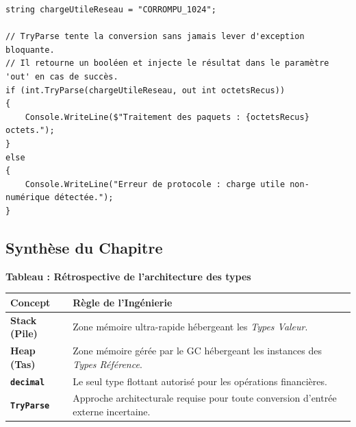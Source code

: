\begin{lstlisting}[caption={Conversion sécurisée via TryParse}]
string chargeUtileReseau = "CORROMPU_1024";

// TryParse tente la conversion sans jamais lever d'exception bloquante.
// Il retourne un booléen et injecte le résultat dans le paramètre 'out' en cas de succès.
if (int.TryParse(chargeUtileReseau, out int octetsRecus))
{
    Console.WriteLine($"Traitement des paquets : {octetsRecus} octets.");
}
else
{
    Console.WriteLine("Erreur de protocole : charge utile non-numérique détectée.");
}
\end{lstlisting}

\subsection{Synthèse du Chapitre}

\begin{center}
    \textbf{Tableau : Rétrospective de l'architecture des types} \\[0.3cm]
    \begin{tabular}{@{}lp{10cm}@{}}
        \toprule
        \textbf{Concept} & \textbf{Règle de l'Ingénierie} \\
        \midrule
        \textbf{Stack (Pile)} & Zone mémoire ultra-rapide hébergeant les \emph{Types Valeur}. \\
        \textbf{Heap (Tas)} & Zone mémoire gérée par le GC hébergeant les instances des \emph{Types Référence}. \\
        \textbf{\texttt{decimal}} & Le seul type flottant autorisé pour les opérations financières. \\
        \textbf{\texttt{TryParse}} & Approche architecturale requise pour toute conversion d'entrée externe incertaine. \\
        \bottomrule
    \end{tabular}
\end{center}
